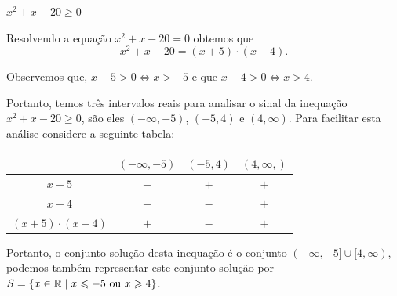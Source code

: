  \begin{exem}
 $x^2 + x - 20 \geqslant 0$
 
 Resolvendo a equação $x^2 + x - 20 = 0$ obtemos que
\begin{equation}
x^2 + x - 20  = (x+5) \cdot (x-4) . 
\end{equation}
 
 Observemos que, $x+5> 0 \Leftrightarrow x> -5$ e que $x-4> 0 \Leftrightarrow x>4$. 
 
 Portanto, temos três intervalos reais para analisar o sinal da inequação $x^2 + x - 20 \geqslant 0$, são eles $(-\infty, -5)$, $(-5, 4)$ e $(4, \infty)$. Para facilitar esta análise considere a seguinte tabela:
 
 \begin{table}[H]
 \centering
 \begin{tabular}{|c|c|c|c|} \hline
 \rowcolor{cinza}
                      & $(-\infty, -5)$ & $(-5, 4)$ & $(4, \infty,)$ \\ \hline
                $x+5$ & $-$             & $+$       & $+$ \\ \hline
                $x-4$ & $-$             & $-$       & $+$ \\ \hline
 $(x+5) \cdot (x-4)$  & $+$             & $-$       & $+$ \\ \hline
 \end{tabular}
 \end{table}
 
 Portanto, o conjunto solução desta inequação é o conjunto $(-\infty, -5] \cup [4, \infty)$, podemos também representar este conjunto solução por $S= \left\{ x \in \mathbb{R} \mid x \leqslant -5 \text{ ou } x \geqslant 4 \right\}$.
 \end{exem}
 
